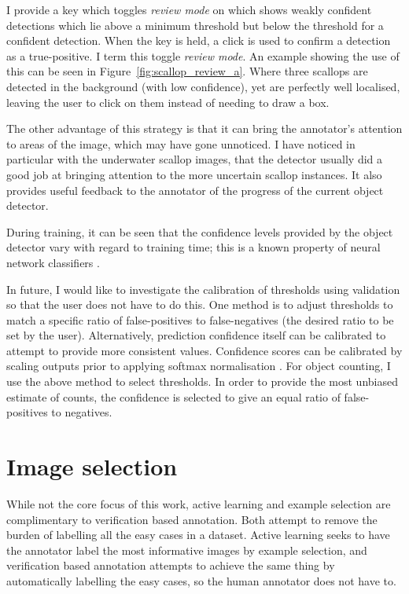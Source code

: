 I provide a key which toggles \emph{review mode} on which shows weakly confident detections which lie above a minimum threshold but below the threshold for a confident detection. When the key is held, a click is used to confirm a detection as a true-positive. I term this toggle \emph{review mode}.  An example showing the use of this can be seen in Figure~\ref{fig:scallop_review_a}. Where three scallops are detected in the background (with low confidence), yet are perfectly well localised, leaving the user to click on them instead of needing to draw a box.

The other advantage of this strategy is that it can bring the annotator's attention to areas of the image, which may have gone unnoticed. I have noticed in particular with the underwater scallop images, that the detector usually did a good job at bringing attention to the more uncertain scallop instances. It also provides useful feedback to the annotator of the progress of the current object detector. 

During training, it can be seen that the confidence levels provided by the object detector vary with regard to training time; this is a known property of neural network classifiers \cite{Guo2017}.

In future, I would like to investigate the calibration of thresholds using validation so that the user does not have to do this. One method is to adjust thresholds to match a specific ratio of false-positives to false-negatives (the desired ratio to be set by the user). Alternatively, prediction confidence itself can be calibrated to attempt to provide more consistent values. Confidence scores can be calibrated by scaling outputs prior to applying softmax normalisation \cite{Guo2017}. For object counting, I use the above method to select thresholds. In order to provide the most unbiased estimate of counts, the confidence is selected to give an equal ratio of false-positives to negatives.
 
\section{Image selection}
\label{sec:example_selection}

While not the core focus of this work, active learning and example selection are complimentary to verification based annotation. Both attempt to remove the burden of labelling all the easy cases in a dataset. Active learning seeks to have the annotator label the most informative images by example selection, and verification based annotation attempts to achieve the same thing by automatically labelling the easy cases, so the human annotator does not have to. 

